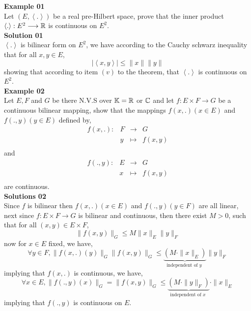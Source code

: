\textbf{Example 01}  \\
Let $( E, \left\langle . \right\rangle )  $  be a real pre-Hilbert space,
prove that the inner product $ \left\langle .\right\rangle  : E^2   \longrightarrow \mathbb{R}  $ 
is continuous on $E^2 $.  \\
\textbf{Solution 01} \\
$\left\langle . \right\rangle  $  is bilinear form on $E^2  $, we have according
to the Cauchy schwarz inequality that for all $x,y \in  E $, 
\[
\left| \left\langle x,y \right\rangle  \right| \leq 
\| x \|  \| y \| 
\]
showing that according to item $(v)$ to the theorem, that 
$\left\langle . \right\rangle  $  is continuous on $E^2$. \\
\textbf{Example 02}  \\
Let $E,F $ and $G $ be there N.V.S over $\mathbb{K} = \mathbb{R} $  or 
$\mathbb{C}  $ and let $ f : E \times F  \longrightarrow G $ be a continuous bilinear mapping, show
that the mappings $f(x,.) (x \in E)   $  and $f(.,y)  (y \in  E) $ defined by, 
\[
\begin{array}{cccc}
      f(x,.)  : &  F  & \longrightarrow & G \\

           &  y  & \longmapsto     & f(x,y)  \\ 
\end{array}
\] 
and 
\[
\begin{array}{cccc}
      f(.,y)  : &  E  & \longrightarrow & G \\

           &  x  & \longmapsto     & f(x,y)  \\ 
\end{array}
\]
are continuous.
\\
\textbf{Solutions 02}
\\
Since $f $ is bilinear then $f(x,.) (x \in  E)   $  and 
$f(.,y) (y \in  F)  $  are all linear, next since 
$ f : E \times F  \longrightarrow G $ is bilinear and continuous, then there
exist $M > 0 $, such that for all $(x,y) \in  E\times F  $, 
\[
\| f(x,y)  \| _{G} \leq M \| x \| _{E} \| y \| _{F}
\]
now for $x \in E $  fixed, we have, 
\[
\forall y \in  F,   
\| f(x,.)(y)   \|  _{G}
\| f(x,y)  \|  _{G } \leq 
\underbrace{
\left( 
	M \cdot \| x \| _{E}
\right)
}_{ \text{ independent of $y $ } }  \| y \|_{F}
\]
implying that $f(x,.)  $  is continuous, we have, 
\[
\forall x \in  E, 
\| f(.,y) (x)  \| _{G} = 
\| f(x,y)  \| _{G} \leq  
\underbrace{
\left( 
	M \cdot \| y \| _{F}
\right) 
}_{\text{ independent of $x $ } } 
\cdot \| x \| _{E}
\] 
implying that $f(.,y)  $  is continuous on $E $.
